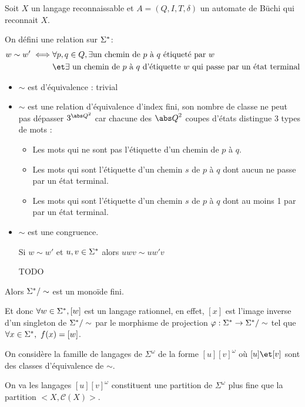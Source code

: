 Soit $X$ un langage reconnaissable et $A = (Q,I,T,\delta)$ un automate de Büchi qui reconnait $X$.


On défini une relation sur $\Sigma^{*}$:
\begin{eqnarray*}
	w \sim w' \iff &\forall p,q \in Q, \exists \text{un chemin de $p$ à $q$ étiqueté par } w \\
	&\et \exists \text{ un chemin de $p$ à $q$ d'étiquette $w$ qui passe par un état terminal}
\end{eqnarray*}


\begin{itemize}
	\item $\sim$ est d'équivalence : trivial
	\item $\sim$ est une relation d'équivalence d'index fini, son nombre de classe ne peut pas dépasser $3^{{\abs Q}^2}$
	      car chacune des ${\abs Q}^2$ coupes d'états distingue 3 types de mots :
	      \begin{itemize}
		      \item Les mots qui ne sont pas l'étiquette d'un chemin de $p$ à $q$.
		      \item Les mots qui sont l'étiquette d'un chemin $s$ de $p$ à $q$ dont aucun ne passe par un état terminal.
		      \item Les mots qui sont l'étiquette d'un chemin $s$ de $p$ à $q$ dont au moins 1 par par un état terminal.
	      \end{itemize}
	\item $\sim$ est une congruence.

	      Si $w \sim w'$ et $u,v \in \Sigma^{*}$ alors $uwv \sim uw'v$

	      TODO
\end{itemize}

Alors $\Sigma^{*} / \sim$ est un monoïde fini.

Et donc $\forall w \in \Sigma^{*}, [w]$ est un langage rationnel, en effet, $[x]$ est l'image inverse d'un singleton de $\Sigma^{*} / \sim$
par le morphisme de projection $\varphi : \Sigma^{*} \to \Sigma^{*} / \sim$ tel que $\forall x \in \Sigma^{*},\ f (x) = [w] $.


On considère la famille de langages de $\Sigma^{\omega}$ de la forme $[u][v]^{\omega}$ où $[u] \et [v]$ sont des classes d'équivalence de $\sim$.

On va \mq les langages $[u][v]^{\omega}$ constituent une partition de $\Sigma^{\omega}$ plus fine que la partition $<X,\mathcal{C}(X)>$.



